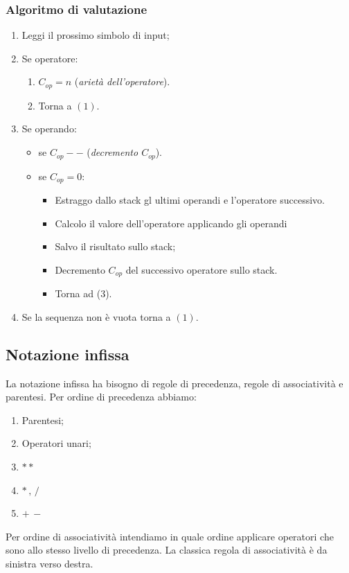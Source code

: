 \documentclass[oneside,a4paper,11pt]{book}
\theoremstyle{italicstyle}
\theoremstyle{normStyle}
\begin{document}
\subsubsection{Algoritmo di valutazione}
\begin{enumerate}
  \item Leggi il prossimo simbolo di input;
  \item Se operatore:
  \begin{enumerate}
    \item $C_{op} = n$ (\textit{arietà dell'operatore}).
    \item  Torna a $(1)$.
  \end{enumerate}
  \item Se operando:
  \begin{itemize}
    \item se $C_{op} --$ (\textit{decremento $C_{op}$}).
    \item se $C_{op} = 0$:
    \begin{itemize}
      \item  Estraggo dallo stack gl ultimi operandi e l'operatore 
      successivo.
      \item Calcolo il valore dell'operatore applicando gli operandi 
      \item Salvo il risultato sullo stack;
      \item Decremento $C_{op}$ del successivo operatore sullo stack.
      \item Torna ad (3).
    \end{itemize}
  \end{itemize}
  \item Se la sequenza non è vuota torna a $(1)$.
\end{enumerate}
\subsection{Notazione infissa}
La notazione infissa ha bisogno di regole di precedenza, regole di associatività 
e parentesi.
Per ordine di precedenza abbiamo:
\begin{enumerate}
  \item Parentesi;
  \item Operatori unari;
  \item $**$
  \item $*\, , \, /$
  \item $+\,-$
\end{enumerate}
Per ordine di associatività intendiamo in quale ordine applicare operatori che sono 
allo stesso livello di precedenza.
La classica regola di associatività è da sinistra verso destra.
\end{document}
